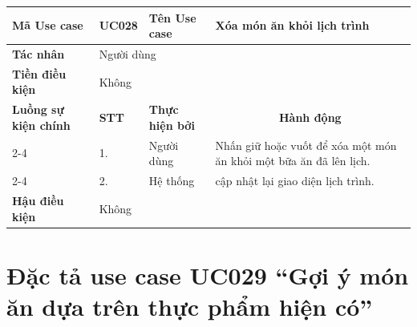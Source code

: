 \begin{longtable}{|p{2.7cm}|p{0.8cm}|p{2.6cm}|p{7.3cm}|}
\hline
\cellcolor[HTML]{D5F5E3}\textbf{Mã Use case} & \multicolumn{1}{l|}{UC028} & \cellcolor[HTML]{D5F5E3}\textbf{Tên Use case} & Xóa món ăn khỏi lịch trình \\ \hline
\cellcolor[HTML]{D5F5E3}\textbf{Tác nhân} & \multicolumn{3}{p{10.7cm}|}{Người dùng} \\ \hline
\cellcolor[HTML]{D5F5E3}\textbf{Tiền điều kiện} & \multicolumn{3}{p{10.7cm}|}{Không} \\ \hline

\cellcolor[HTML]{D5F5E3}\textbf{Luồng sự kiện chính} & \cellcolor[HTML]{FDEBD0}\textbf{STT} & \cellcolor[HTML]{FDEBD0}\textbf{Thực hiện bởi} & \multicolumn{1}{c|}{\cellcolor[HTML]{FDEBD0}\textbf{Hành động}} \\ \cline{2-4} 
\cellcolor[HTML]{D5F5E3} & 1. & Người dùng & Nhấn giữ hoặc vuốt để xóa một món ăn khỏi một bữa ăn đã lên lịch. \\ \cline{2-4} 
\cellcolor[HTML]{D5F5E3} & 2. & Hệ thống & cập nhật lại giao diện lịch trình. \\ \hline

\cellcolor[HTML]{D5F5E3}\textbf{Hậu điều kiện} & \multicolumn{3}{p{10.7cm}|}{Không} \\ \hline
\end{longtable}
\endgroup

\section{Đặc tả use case UC029 ``Gợi ý món ăn dựa trên thực phẩm hiện có''}
\vspace{0.5cm}

\begingroup
\renewcommand{\arraystretch}{1.5}

